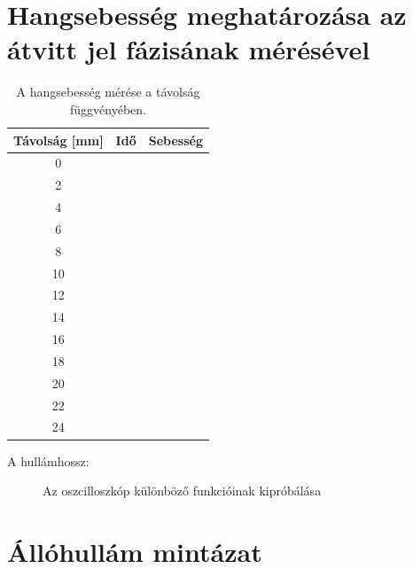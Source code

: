 \documentclass{article}
\begin{document}
\section{Hangsebesség meghatározása az átvitt jel fázisának mérésével}


\begin{table}[h!]
    \centering
    \begin{tabular}{|c|c|c|}
        \hline
        Távolság [mm] & Idő & Sebesség \\ \hline
        0 & & \\ \hline
        2 & & \\ \hline
        4 & & \\ \hline
        6 & & \\ \hline
        8 & & \\ \hline
        10 & & \\ \hline
        12 & & \\ \hline
        14 & & \\ \hline
        16 & & \\ \hline
        18 & & \\ \hline
        20 & & \\ \hline
        22 & & \\ \hline
        24 & & \\ \hline
    \end{tabular}
    \caption{A hangsebesség mérése a távolság függvényében.}
    \label{tab:hangsebesseg_meres}
\end{table}

A hullámhossz:

\begin{figure}[htp]
    \centering
    \caption{Az oszcilloszkóp különböző funkcióinak kipróbálása}
    \label{hangsebesség_grafikon}
\end{figure}


\section{Állóhullám mintázat}
\end{document}
